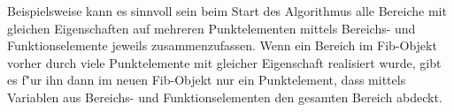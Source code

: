 Beispielsweise kann es sinnvoll sein beim Start des Algorithmus alle Bereiche mit gleichen Eigenschaften auf mehreren Punktelementen mittels Bereichs- und Funktionselemente jeweils zusammenzufassen. Wenn ein Bereich im Fib-Objekt vorher durch viele Punktelemente mit gleicher Eigenschaft realisiert wurde, gibt es f"ur ihn dann im neuen Fib-Objekt nur ein Punktelement, dass mittels Variablen aus Bereichs- und Funktionselementen den gesamten Bereich abdeckt.












